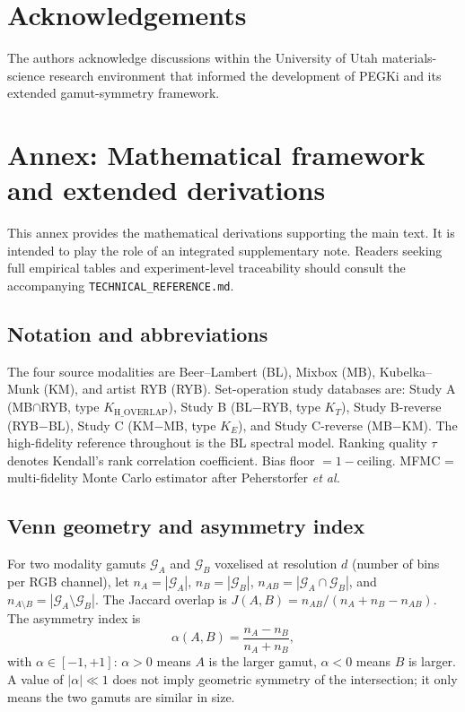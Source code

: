 \documentclass[twoside,twocolumn,9pt]{article}
\begin{document}
\section*{Acknowledgements}
The authors acknowledge discussions within the University of Utah materials-science research environment that informed the development of PEGKi and its extended gamut-symmetry framework.


\balance




\clearpage
\appendix
\section{Annex: Mathematical framework and extended derivations}

This annex provides the mathematical derivations supporting the main text. It is intended to play the role of an integrated supplementary note. Readers seeking full empirical tables and experiment-level traceability should consult the accompanying \texttt{TECHNICAL\_REFERENCE.md}.

\subsection{Notation and abbreviations}

The four source modalities are Beer--Lambert (BL), Mixbox (MB), Kubelka--Munk (KM), and artist RYB (RYB). Set-operation study databases are: Study A (MB$\cap$RYB, type $K_{\mathrm{H\_OVERLAP}}$), Study B (BL$-$RYB, type $K_T$), Study B-reverse (RYB$-$BL), Study C (KM$-$MB, type $K_E$), and Study C-reverse (MB$-$KM). The high-fidelity reference throughout is the BL spectral model. Ranking quality $\tau$ denotes Kendall's rank correlation coefficient. Bias floor $= 1 - \mathrm{ceiling}$. MFMC = multi-fidelity Monte Carlo estimator after Peherstorfer \emph{et al.}\cite{Peherstorfer2018SurveyMF}

\subsection{Venn geometry and asymmetry index}

For two modality gamuts $\mathcal{G}_A$ and $\mathcal{G}_B$ voxelised at resolution $d$ (number of bins per RGB channel), let $n_A = |\mathcal{G}_A|$, $n_B = |\mathcal{G}_B|$, $n_{AB} = |\mathcal{G}_A \cap \mathcal{G}_B|$, and $n_{A \setminus B} = |\mathcal{G}_A \setminus \mathcal{G}_B|$. The Jaccard overlap is $J(A,B) = n_{AB} / (n_A + n_B - n_{AB})$. The asymmetry index is
\[
\alpha(A, B) = \frac{n_A - n_B}{n_A + n_B},
\]
with $\alpha \in [-1, +1]$: $\alpha > 0$ means $A$ is the larger gamut, $\alpha < 0$ means $B$ is larger. A value of $|\alpha| \ll 1$ does not imply geometric symmetry of the intersection; it only means the two gamuts are similar in size.
\end{document}
